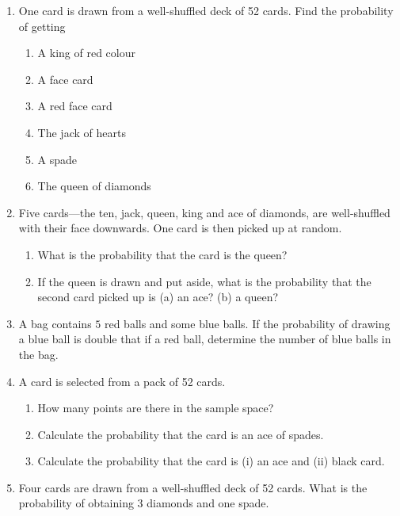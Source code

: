 \begin{enumerate}[label=\thesection.\arabic*,ref=\thesection.\theenumi]
	\item One card is drawn from a well-shuffled deck of 52 cards. Find the probability of getting
\begin{enumerate}
\item A king of red colour 
\item A face card 
\item A red face card
\item The jack of hearts
\item A spade
\item The queen of diamonds

\end{enumerate}
\solution
		
	\item Five cards—the ten, jack, queen, king and ace of diamonds, are well-shuffled with their face downwards. One card is then picked up at random.
\begin{enumerate}
\item
What is the probability that the card is the queen? 
\item
If the queen is drawn and put aside, what is the probability that the second card picked up is (a) an ace? (b) a queen?\\
\end{enumerate}
\solution
		
	\item A bag contains $5$ red balls and some blue balls. If the probability of drawing a blue ball is double that if a red ball, determine the number of blue balls in the bag. 
		\\
\solution
		
	\item A card is selected from a pack of 52 cards.
 \begin{enumerate}[label=(\alph*)] 
                 \item How many points are there in the sample space?
                 \item Calculate the probability that the card is an ace of spades.
                 \item Calculate the probability that the card is (i) an ace and (ii) black card.
 \end{enumerate}
\solution
		
\item Four cards are drawn from a well-shuffled deck of 52 cards. What is the probability of obtaining 3 diamonds and one spade.
\\

\end{enumerate}
